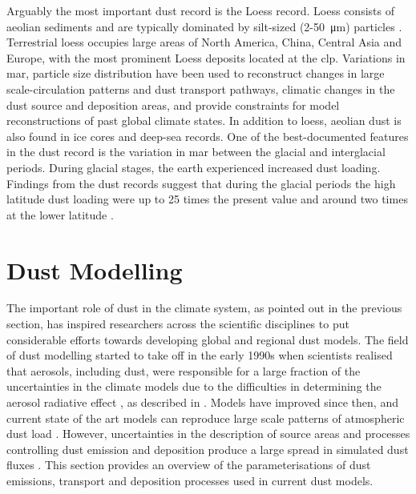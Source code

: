 Arguably the most important dust record is the Loess record. Loess consists of aeolian sediments and are typically dominated by silt-sized (2-\SI{50}{\micro\metre}) particles \parencite{muhs2014loess}. Terrestrial loess occupies large areas of North America, China, Central Asia and Europe, with the most prominent Loess deposits located at the \acrfull{clp}.
Variations in \acrfull{mar}, particle size distribution have been used to reconstruct changes in large scale-circulation patterns and dust transport pathways, climatic changes in the dust source and deposition areas, and provide constraints for model reconstructions of past global climate states. In addition to loess, aeolian dust is also found in ice cores and deep-sea records. One of the best-documented features in the dust record is the variation in \acrfull{mar} between the glacial and interglacial periods. During glacial stages, the earth experienced increased dust loading. Findings from the dust records suggest that during the glacial periods the high latitude dust loading were up to 25 times the present value and around two times at the lower latitude \parencite{shao2011dust}.     


\section{Dust Modelling}\label{sec:dust_modelling}
The important role of dust in the climate system, as pointed out in the previous section, has inspired researchers across the scientific disciplines to put considerable efforts towards developing global and regional dust models. 
The field of dust modelling started to take off in the early 1990s when scientists realised that aerosols, including dust, were responsible for a large fraction of the uncertainties in the climate models due to the difficulties in determining the aerosol radiative effect \parencite{tegen1996influence}, as described in . 
Models have improved since then, and current state of the art models can reproduce large scale patterns of atmospheric dust load . 
However, uncertainties in the description of source areas and processes controlling dust emission and deposition produce a large spread in simulated dust fluxes \parencite{huneeus2011global}. 
This section provides an overview of the parameterisations of dust emissions, transport and deposition processes used in current dust models. 
 
